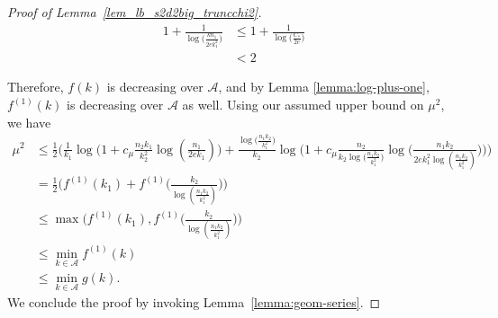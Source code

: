 \documentclass{article}
\newcommand{\cA}{\mathcal{A}}
\newcommand{\Ct}{C_{*}}
\begin{document}
\begin{proof}[Proof of Lemma~\ref{lem_lb_s2d2big_truncchi2}]
    \begin{align*}
        1 + \frac{1}{\log \big(\frac{kn_1}{2ek_1^2}\big)} &\leq 1 + \frac{1}{\log\big(\frac{\Ct}{2e}\big)} \\
        &< 2
    \end{align*}

    Therefore, $f(k)$ is decreasing over $\cA$, and by Lemma \ref{lemma:log-plus-one}, $f^{(1)}(k)$ is decreasing over $\cA$ as well. Using our assumed upper bound on $\mu^2$, we have 
    \begin{align*}
        \mu^2 &\leq \frac12\bigg(\frac{1}{k_1}\log\Big(1 + c_\mu \frac{n_2k_1}{k_2^2}\log(\frac{n_1}{2ek_1})\Big) + \frac{\log\big(\frac{n_1k_2}{k_1^2}\big)}{k_2}\log\Big(1 + c_\mu \frac{n_2}{k_2\log\big(\frac{n_1k_2}{k_1^2}\big)}\log\big(\frac{n_1k_2}{2ek_1^2\log(\frac{n_1k_2}{k_1^2})}\big)\Big)\bigg) \\
        &= \frac12\Big(f^{(1)}(k_1) + f^{(1)}\big(\frac{k_2}{\log(\frac{n_1k_2}{k_1^2})}\big)\Big) \\
        &\leq \max\Big(f^{(1)}(k_1), f^{(1)}\big(\frac{k_2}{\log(\frac{n_1k_2}{k_1^2})}\big)\Big) \\
        &\leq \min_{k \in \cA}f^{(1)}(k) \\
        &\leq \min_{k\in \cA}g(k).
    \end{align*}
    We conclude the proof by invoking Lemma~\ref{lemma:geom-series}. 
\end{proof}
\end{document}
